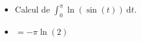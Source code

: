 \begin{itemize}
    \item Calcul de $\int_{0}^{\pi} \ln(\sin(t))\ \mathrm{d}t.$
    \item $=-\pi \ln(2)$
\end{itemize}